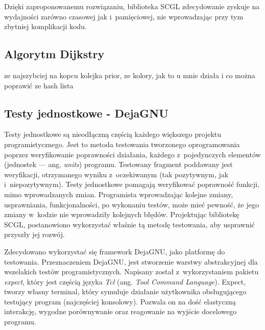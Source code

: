 \documentclass[a4paper,12pt,polish,oneside]{thesis}
\begin{document}
Dzięki zaproponowanemu rozwiązaniu, biblioteka SCGL zdecydowanie zyskuje na wydajności zarówno czasowej jak i~pamięciowej, nie wprowadzając przy tym zbytniej komplikacji kodu.

\subsection{Algorytm Dijkstry}
\label{chap:dijkstra}
ze najszybciej na kopcu kolejka prior, ze kolory, jak to u mnie działa i co można poprawić ze hash lista
\subsection{Testy jednostkowe - DejaGNU}
Testy jednostkowe są nieodłączną częścią każdego większego projektu programistycznego.
Jest to metoda testowania tworzonego oprogramowania poprzez weryfikowanie poprawności działania, każdego z~pojedynczych elementów (jednostek --- ang. \emph{units}) programu.
Testowany fragment poddawany jest weryfikacji, otrzymanego wyniku z~oczekiwanym (tak pozytywnym, jak i~niepozytywnym).
Testy jednostkowe pomagają weryfikować poprawność funkcji, mimo wprowadzanych zmian.
Programista wprowadzając kolejne zmiany, usprawniania, funkcjonalności, po wykonaniu testów, może mieć pewność, że jego zmiany w~kodzie nie wprowadziły kolejnych błędów.
Projektując bibliotekę SCGL, postanowiono wykorzystać właśnie tą metodę testowania, aby usprawnić przyszły jej rozwój.

Zdecydowano wykorzystać się framework DejaGNU, jako platformę do testowania.
Przeznaczeniem DejaGNU, jest stworzenie warstwy abstrakcyjnej dla wszelakich testów programistycznych.
Napisany został z~wykorzystaniem pakietu \emph{expect}, który jest częścią języka \emph{Tcl} (ang. \emph{Tool Command Language}).
Expect, tworzy własny terminal, który symuluje działanie użytkownika obsługującego testujący program (najczęściej konsolowy).
Pozwala on na dość elastyczną interakcję, wygodne porównywanie oraz reagowanie na wyjście docelowego programu.
\end{document}
